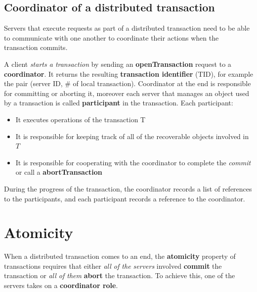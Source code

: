 \subsection{Coordinator of a distributed transaction}
Servers that execute requests as part of a distributed transaction need to be able to communicate with one another to coordinate their actions when the transaction commits.

A client \textit{starts a transaction} by sending an \textbf{openTransaction} request to a \textbf{coordinator}. It returns the resulting \textbf{transaction identifier} (TID), for example the pair (server ID, \# of local transaction). Coordinator at the end is responsible for committing or aborting it, moreover each server that manages an object used by a transaction is called \textbf{participant} in the transaction.
Each participant:
\begin{itemize}
    \item It executes operations of the transaction T
    \item It is responsible for keeping track of all of the recoverable objects involved in \(T\)
    \item It is responsible for cooperating with the coordinator to complete the \textit{commit} or call a \textbf{abortTransaction}
\end{itemize}

During the progress of the transaction, the coordinator records a list of references to the participants, and each participant records a reference to the coordinator.

\section{Atomicity}
When a distributed transaction comes to an end, the \textbf{atomicity} property of transactions requires that either \textit{all of the servers} involved \textbf{commit} the transaction or \textit{all of them} \textbf{abort} the transaction. To achieve this, one of the servers takes on a \textbf{coordinator role}.

